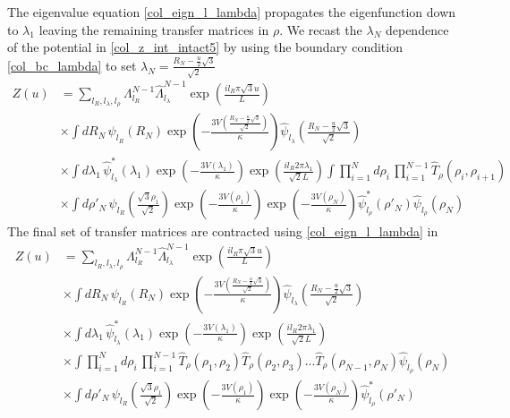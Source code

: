 %
The eigenvalue equation \eqref{col_eign_l_lambda} propagates the eigenfunction down to $\lambda_{1}$ leaving the remaining transfer matrices in $\rho$. We recast the $\lambda_N$ dependence of the potential in \eqref{col_z_int_intact5} by using the boundary condition \eqref{col_bc_lambda} to set $\lambda_N=\frac{R_N-\frac{u}{2}\sqrt{3}}{\sqrt{2}}$
%
\begin{align}\label{col_z_int_intact6}
Z\left(u\right)&=\sum_{l_{R},l_\lambda,l_\rho}\Lambda_{l_R}^{N-1}\hat{\Lambda}_{l_\lambda}^{N-1}\exp\left(\frac{il_{R}\pi \sqrt{3}u}{L}\right)\nonumber\\
&\times\int dR_N\,\psi_{l_R}\left(R_{N}\right)\exp\left(-\frac{3V\left(\frac{R_N-\frac{u}{2}\sqrt{3}}{\sqrt{2}}\right)}{\kappa}\right)\hat{\psi}_{l_\lambda}\left(\frac{R_N-\frac{u}{2}\sqrt{3}}{\sqrt{2}}\right)\nonumber\\
&\times\int d\lambda_1\, \hat{\psi}^{*}_{l_\lambda}\left(\lambda_{1}\right)\exp\left(-\frac{3V(\lambda_{1})}{\kappa}\right)\exp\left(\frac{il_{R}2\pi\lambda_1}{\sqrt{2}L} \right)\int\prod^{N}_{i=1}d\rho_i\,\prod^{N-1}_{i=1}\hat{T}_{\rho}(\rho_i,\rho_{i+1})\nonumber\\
&\times\int d\rho'_N\,\psi_{l_R}\left( \frac{\sqrt{3}\rho_1}{\sqrt{2}}\right)\exp\left(-\frac{3V(\rho_{1})}{\kappa}\right)\exp\left(-\frac{3V(\rho_{N})}{\kappa}\right)\hat{\psi}^{*}_{l_\rho}\left(\rho'_{N}\right)\hat{\psi}_{l_\rho}\left(\rho_{N}\right)
\end{align}
%
The final set of transfer matrices are contracted using \eqref{col_eign_l_lambda} in
%
\begin{align}\label{col_z_int_intact7}
Z\left(u\right)&=\sum_{l_R,l_\lambda,l_\rho}\Lambda_{l_R}^{N-1}\hat{\Lambda}_{l_\lambda}^{N-1}\exp\left(\frac{il_{R}\pi \sqrt{3}u}{L}\right)\nonumber\\
&\times\int dR_N\,\psi_{l_R}\left(R_{N}\right)\exp\left(-\frac{3V\left(\frac{R_N-\frac{u}{2}\sqrt{3}}{\sqrt{2}}\right)}{\kappa}\right)\hat{\psi}_{l_\lambda}\left(\frac{R_N-\frac{u}{2}\sqrt{3}}{\sqrt{2}}\right)\nonumber\\
&\times\int d\lambda_1\, \hat{\psi}^{*}_{l_\lambda}\left(\lambda_{1}\right)\exp\left(-\frac{3V(\lambda_{1})}{\kappa}\right)\exp\left(\frac{il_{R}2\pi\lambda_1}{\sqrt{2}L} \right)\nonumber\\
&\times\int\prod^{N}_{i=1}d\rho_i\,\prod^{N-1}_{i=1}\hat{T}_{\rho}(\rho_1,\rho_2)\hat{T}_{\rho}(\rho_2,\rho_3)...\hat{T}_{\rho}(\rho_{N-1},\rho_{N})\hat{\psi}_{l_\rho}\left(\rho_{N}\right)\nonumber\\
&\times\int d\rho'_N\,\psi_{l_R}\left( \frac{\sqrt{3}\rho_1}{\sqrt{2}}\right)\exp\left(-\frac{3V(\rho_{1})}{\kappa}\right)\exp\left(-\frac{3V(\rho_{N})}{\kappa}\right)\hat{\psi}^{*}_{l_\rho}\left(\rho'_{N}\right)
\end{align}

